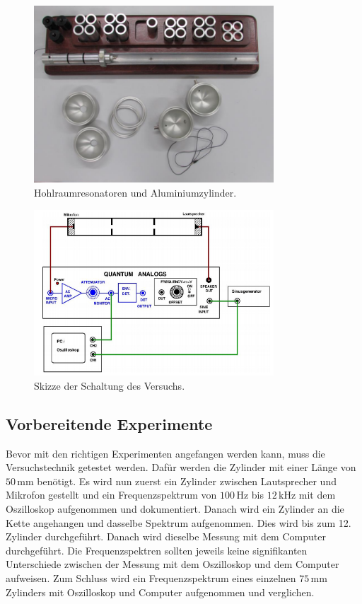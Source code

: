 \begin{figure}[H]
    \centering
    \includegraphics[width=0.8\textwidth]{Experiment.PNG}
    \caption{Hohlraumresonatoren und Aluminiumzylinder. \cite{Anleitung}}
    \label{fig:material}
\end{figure}

\begin{figure}[H]
    \centering
    \includegraphics[width=0.8\textwidth]{Schaltung.PNG}
    \caption{Skizze der Schaltung des Versuchs. \cite{Anleitung}}
    \label{fig:schaltung}
\end{figure}

\subsection{Vorbereitende Experimente}
\label{sec:vorbereitung}

Bevor mit den richtigen Experimenten angefangen werden kann, muss die Versuchstechnik getestet werden. Dafür werden die Zylinder mit einer Länge von $50 \, \mathrm{mm}$ benötigt. Es wird nun zuerst ein Zylinder zwischen Lautsprecher und Mikrofon gestellt und ein Frequenzspektrum von $100 \, \mathrm{Hz}$ bis $12 \, \mathrm{kHz}$ mit dem Oszilloskop aufgenommen und dokumentiert. Danach wird ein Zylinder an die Kette angehangen und dasselbe Spektrum aufgenommen. Dies wird bis zum 12. Zylinder durchgeführt. Danach wird dieselbe Messung mit dem Computer durchgeführt. Die Frequenzspektren sollten jeweils keine signifikanten Unterschiede zwischen der Messung mit dem Oszilloskop und dem Computer aufweisen. Zum Schluss wird ein Frequenzspektrum eines einzelnen $75 \, \mathrm{mm}$ Zylinders mit Oszilloskop und Computer aufgenommen und verglichen.

